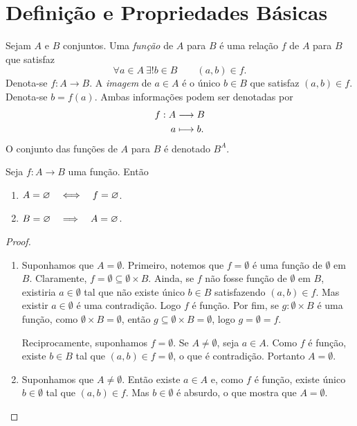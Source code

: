 \section{Definição e Propriedades Básicas}

\begin{defi}
Sejam $A$ e $B$ conjuntos. Uma \emph{função} de $A$ para $B$ é uma relação $f$ de $A$ para $B$ que satisfaz
	\begin{equation*}
	\forall a \in A \ \exists! b \in B \qquad (a,b) \in f.
	\end{equation*}
Denota-se $f: A \to B$. A \emph{imagem} de $a \in A$ é o único $b \in B$ que satisfaz $(a,b) \in f$. Denota-se $b=f(a)$. Ambas informações podem ser denotadas por
	\begin{align*}
	{f}: {A} &\longrightarrow {B} \\{a} &\longmapsto {b}.
	\end{align*}
O conjunto das funções de $A$ para $B$ é denotado $B^A$.
\end{defi}

\begin{prop}
Seja $f: A \to B$ uma função. Então
	\begin{enumerate}
	\item $A=\varnothing \quad \Longleftrightarrow \quad f=\varnothing$.
	\item $B=\varnothing \quad \Longrightarrow \quad A=\varnothing$.
	\end{enumerate}
\end{prop}
\begin{proof}
	\begin{enumerate}
	\item Suponhamos que $A=\emptyset$. Primeiro, notemos que $f=\emptyset$ é uma função de $\emptyset$ em $B$. Claramente, $f = \emptyset \subseteq \emptyset \times B$. Ainda, se $f$ não fosse função de $\emptyset$ em $B$, existiria $a \in \emptyset$ tal que não existe único $b \in B$ satisfazendo $(a,b) \in f$. Mas existir $a \in \emptyset$ é uma contradição. Logo $f$ é função. Por fim, se $g: \emptyset \times B$ é uma função, como $\emptyset \times B = \emptyset$, então $g \subseteq \emptyset \times B = \emptyset$, logo $g=\emptyset=f$.
	
Reciprocamente, suponhamos $f=\emptyset$. Se $A \neq \emptyset$, seja $a \in A$. Como $f$ é função, existe $b \in B$ tal que $(a,b) \in f=\emptyset$, o que é contradição. Portanto $A=\emptyset$.
	
	\item Suponhamos que $A \neq \emptyset$. Então existe $a \in A$ e, como $f$ é função, existe único $b \in \emptyset$ tal que $(a,b) \in f$. Mas $b \in \emptyset$ é absurdo, o que mostra que $A = \emptyset$.
	\end{enumerate}
\end{proof}


